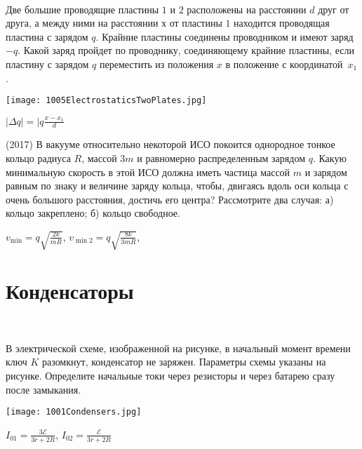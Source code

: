 \begin{ex}
\hspace{0pt} \\
\begin{minipage}{.65\textwidth}
Две большие проводящие пластины $1$ и $2$ расположены на расстоянии $d$ друг от друга, 
а между ними на расстоянии $х$ от пластины $1$ находится проводящая пластина с зарядом $q$. 
Крайние пластины соединены проводником и имеют заряд $-q$. 
Какой заряд пройдет по проводнику, соединяющему крайние пластины, если пластину с зарядом $q$ переместить из положения $x$ в положение с координатой~$x_1$.
\end{minipage}
\begin{minipage}{.35\textwidth}
\centering
\texttt{[image: 1005ElectrostaticsTwoPlates.jpg]}
\end{minipage}
\begin{ans}
$\mid\Delta q \mid = \mid q \frac{x-x_1}{d}$
\end{ans}
\end{ex}

\begin{ex}
(2017) В вакууме относительно некоторой ИСО покоится однородное тонкое кольцо радиуса $R$, массой $3m$ и равномерно распределенным зарядом $q$. Какую минимальную скорость в этой ИСО должна иметь частица массой $m$ и зарядом равным по знаку и величине заряду кольца, чтобы, двигаясь вдоль оси кольца с очень большого расстояния, достичь его центра? Рассмотрите два случая: а) кольцо закреплено; б) кольцо свободное.
\begin{ans}
$v_{\min} = q\sqrt{\frac{2k}{mR}}$, $v_{\min 2} = q\sqrt{\frac{8k}{3mR}}$, 
\end{ans}
\end{ex}

\section{Конденсаторы}

\begin{ex}
\hspace{0pt} \\
\begin{minipage}{.65\textwidth}
В электрической схеме, изображенной на рисунке, в начальный момент времени ключ $K$ разомкнут, конденсатор не заряжен. 
Параметры схемы указаны на рисунке. Определите начальные токи через резисторы и через батарею сразу после замыкания.
\end{minipage}
\begin{minipage}{.35\textwidth}
\centering
\texttt{[image: 1001Condensers.jpg]}
\end{minipage}
\begin{ans}
$I_{01} = \frac{3 \mathcal{E}}{3r+2R}$, $I_{02} = \frac{\mathcal{E}}{3r+2R}$
\end{ans}
\end{ex}


